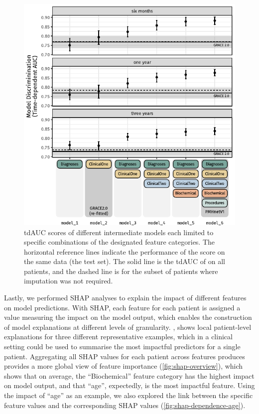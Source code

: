 \begin{figure}[htb]
    \includegraphics[trim=5mm 8mm 0 0]{graphics/pmhnet-v1-category-overview.pdf}
    \caption[Performance of intermediate  models]{%
        \acs{tdAUC} scores of different intermediate  models each
        limited to specific combinations of the designated feature categories.
        The horizontal reference lines indicate the performance of the \graceii{}
        score on the same data (the test set). The solid line is the \ac{tdAUC}
        of \graceii{} on all patients, and the dashed line is for the subset
        of patients where imputation was not required.%
    }
    \label{fig:category-overview}
\end{figure}%

Lastly, we performed \ac{SHAP} analyses to explain the impact of different
features on model predictions. With \ac{SHAP}, each feature for each patient
is assigned a value measuring the impact on the model output, which enables
the construction of model explanations at different levels of granularity.
, shows local patient-level explanations for 
three different representative examples, which in a clinical setting could
be used to summarise the most impactful predictors for a single patient.
Aggregating all \ac{SHAP} values for each patient across features produces
provides a more global view of feature importance (\cref{fig:shap-overview}),
which shows that on average, the \enquote{Biochemical} feature category 
has the highest impact on model output, and that \enquote{age}, expectedly, 
is the most impactful feature. Using the impact of \enquote{age} as an example,
we also explored the link between the specific feature values 
and the corresponding \ac{SHAP} values (\cref{fig:shap-dependence-age}).

